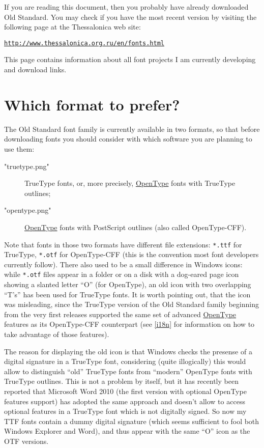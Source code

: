 \documentclass[12pt,a4paper,openany]{book}
\begin{document}
If you are reading this document, then you probably have already downloaded
Old Standard. You may check if you have the most recent version by visiting
the following page at the Thessalonica web site: 

\href{http://www.thessalonica.org.ru/en/fonts.html}
{\texttt{http://www.thessalonica.org.ru/en/fonts.html}}

This page contains information about all font projects I am currently
developing and download links.

\section{Which format to prefer?}

The Old Standard font family is currently available in two formats, so that
before downloading fonts you should consider with which software you are
planning to use them:

\begin{description}

\item[\XeTeXpicfile "truetype.png"] TrueType fonts, or, more precisely,
\hyperlink{OT}{OpenType} fonts with TrueType outlines;

\item[\XeTeXpicfile "opentype.png"] \hyperlink{OT}{OpenType} fonts with
PostScript outlines (also called OpenType-CFF).

\end{description}

Note that fonts in those two formats have different file extensions:
\texttt{*.ttf} for TrueType, \texttt{*.otf} for OpenType-CFF
(this is the convention most font developers currently follow).
There also used to be a small difference in Windows icons: while \texttt{*.otf}
files appear in a folder or on a disk with a dog-eared page icon
showing a slanted letter “O” (for OpenType), an old icon with two overlapping
“T’s” has been used for TrueType fonts. It is worth pointing out, that the
icon was misleading, since the TrueType version of the Old Standard
family beginning from the very first releases supported the same set of
advanced \hyperlink{OT}{OpenType} features as its OpenType-CFF counterpart
(see \autoref{i18n} for information on how to take advantage of those
features).

The reason for displaying the old icon is that Windows checks the presense of
a digital signature in a TrueType font, considering (quite illogically)
this would allow to distinguish “old” TrueType fonts from “modern” OpenType
fonts with TrueType outlines. This is not a problem by itself, but it
has recently been reported that Microsoft Word 2010 (the first version
with optional OpenType features support) has adopted the same approach
and doesn't allow to access optional features in a TrueType font which
is not digitally signed. So now my TTF fonts contain a dummy digital signature
(which seems sufficient to fool both Windows Explorer and Word), and thus
appear with the same “O” icon as the OTF versions.
\end{document}
